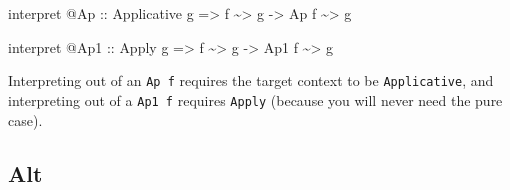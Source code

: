 \documentclass[]{article}
\newenvironment{Shaded}{}{}
\newcommand{\DataTypeTok}[1]{\textcolor[rgb]{0.56,0.13,0.00}{#1}}
\newcommand{\NormalTok}[1]{#1}
\newcommand{\OperatorTok}[1]{\textcolor[rgb]{0.40,0.40,0.40}{#1}}
\newcommand{\OtherTok}[1]{\textcolor[rgb]{0.00,0.44,0.13}{#1}}
\begin{document}
\begin{itemize}
\begin{Shaded}
\begin{Highlighting}[]
\NormalTok{interpret }\OperatorTok{@}\DataTypeTok{Ap}
\OtherTok{    ::} \DataTypeTok{Applicative}\NormalTok{ g}
    \OtherTok{=>}\NormalTok{ f }\OperatorTok{\textasciitilde{}>}\NormalTok{ g}
    \OtherTok{{-}>} \DataTypeTok{Ap}\NormalTok{ f }\OperatorTok{\textasciitilde{}>}\NormalTok{ g}

\NormalTok{interpret }\OperatorTok{@}\DataTypeTok{Ap1}
\OtherTok{    ::} \DataTypeTok{Apply}\NormalTok{ g}
    \OtherTok{=>}\NormalTok{ f }\OperatorTok{\textasciitilde{}>}\NormalTok{ g}
    \OtherTok{{-}>} \DataTypeTok{Ap1}\NormalTok{ f }\OperatorTok{\textasciitilde{}>}\NormalTok{ g}
\end{Highlighting}
\end{Shaded}

  Interpreting out of an \texttt{Ap\ f} requires the target context to be
  \texttt{Applicative}, and interpreting out of a \texttt{Ap1\ f} requires
  \texttt{Apply} (because you will never need the pure case).
\end{itemize}

\hypertarget{alt}{%
\subsection{Alt}\label{alt}}
\end{document}
